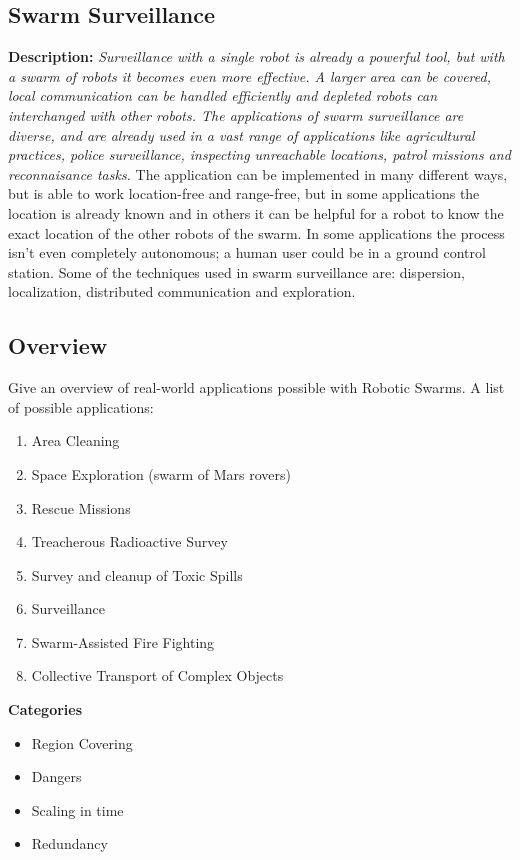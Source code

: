 \subsection{Swarm Surveillance}
\textbf{Description: } \emph{Surveillance with a single robot is already a powerful tool, but with a swarm of robots it becomes even more effective. A larger area can be covered, local communication can be handled efficiently and depleted robots can interchanged with other robots. The applications of swarm surveillance are diverse, and are already used in a vast range of applications like agricultural practices, police surveillance, inspecting unreachable locations, patrol missions and reconnaisance tasks.} 
The application can be implemented in many different ways, but is able to work location-free and range-free, but in some applications the location is already known and in others it can be helpful for a robot to know the exact location of the other robots of the swarm. In some applications the process isn't even completely autonomous; a human user could be in a ground control station. Some of the techniques used in swarm surveillance are: dispersion, localization, distributed communication and exploration. \cite{Burkle2010}

  
  \subsection{Overview}
  Give an overview of real-world applications possible with Robotic Swarms. A list of possible applications:
    \begin{enumerate}
      \item Area Cleaning
      \item Space Exploration (swarm of Mars rovers)
      \item Rescue Missions
      \item Treacherous Radioactive Survey
      \item Survey and cleanup of Toxic Spills
      \item Surveillance
      \item Swarm-Assisted Fire Fighting
     \item Collective Transport of Complex Objects
    \end{enumerate}
  \textbf{Categories}
    \begin{itemize}
      \item Region Covering
      \item Dangers
      \item Scaling in time
      \item Redundancy
    \end{itemize}
  